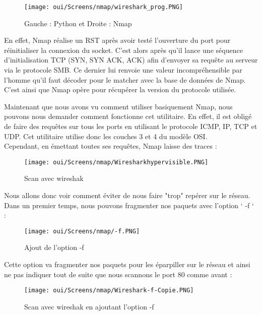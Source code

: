 \begin{figure}[htp!]
  \centering
  \setlength\figureheight{7cm}
  \setlength\figurewidth{9cm}
  \texttt{[image: oui/Screens/nmap/wireshark\_prog.PNG]}
  \caption{Gauche : Python et Droite : Nmap}
  \label{fig:courbe-tikz}
\end{figure}

En effet, Nmap réalise un RST après avoir testé l'ouverture du port pour réinitialiser la connexion du socket. C'est alors après qu'il lance une séquence d'initialisation TCP (SYN, SYN ACK, ACK) afin d'envoyer sa requête au serveur via le protocole SMB. Ce dernier lui renvoie une valeur incompréhensible par l'homme qu'il faut décoder pour le matcher avec la base de données de Nmap. C'est ainsi que Nmap opère pour récupérer la version du protocole utilisée.


\newpage
Maintenant que nous avons vu comment utiliser basiquement Nmap, nous pouvons nous demander comment fonctionne cet utilitaire. En effet, il est obligé de faire des requêtes sur tous les ports en utilisant le protocole ICMP, IP, TCP et UDP. Cet utilitaire utilise donc les couches 3 et 4 du modèle OSI.\\
Cependant, en émettant toutes ses requêtes, Nmap laisse des traces :
\begin{figure}[htp!]
  \centering
  \setlength\figureheight{7cm}
  \setlength\figurewidth{9cm}
  \texttt{[image: oui/Screens/nmap/Wiresharkhypervisible.PNG]}
  \caption{Scan avec wireshak}
  \label{fig:courbe-tikz}
\end{figure}

Nous allons donc voir comment éviter de nous faire "trop" repérer sur le réseau.\\
Dans un premier temps, nous pouvons fragmenter nos paquets avec l’option ‘ -f ‘ :
\begin{figure}[htp!]
  \centering
  \setlength\figureheight{7cm}
  \setlength\figurewidth{9cm}
  \texttt{[image: oui/Screens/nmap/-f.PNG]}
  \caption{Ajout de l'option -f}
  \label{fig:courbe-tikz}
\end{figure}

Cette option va fragmenter nos paquets pour les éparpiller sur le réseau et ainsi ne pas indiquer tout de suite que nous scannons le port 80 comme avant :
\begin{figure}[htp!]
  \centering
  \setlength\figureheight{7cm}
  \setlength\figurewidth{9cm}
  \texttt{[image: oui/Screens/nmap/Wireshark-f-Copie.PNG]}
  \caption{Scan avec wireshak en ajoutant l'option -f}
  \label{fig:courbe-tikz}
\end{figure}

